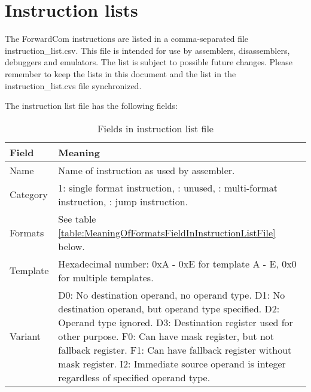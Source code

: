 \documentclass[forwardcom.tex]{subfiles}
\begin{document}
\RaggedRight

\chapter{Instruction lists}\label{chap:InstructionLists}
The ForwardCom instructions are listed in a comma-separated file instruction\_list.csv. This file is intended for use by assemblers, disassemblers, debuggers and emulators. The list is subject to possible future changes. Please remember to keep the lists in this document and the list in the instruction\_list.cvs file synchronized.
\vv

The instruction list file has the following fields:

\begin{longtable} {|p{18mm}|p{100mm}|}
\caption{Fields in instruction list file} 
\label{table:fieldsInInstructionListFile}
\\
\endfirsthead
\endhead
\hline
\bfseries Field & \bfseries Meaning  \\
\hline
Name & Name of instruction as used by assembler.  \\
\hline
Category & 1: single format instruction, \newline
           2: unused,  \newline
           3: multi-format instruction,  \newline
           4: jump instruction. \\
\hline
Formats & See table \ref{table:MeaningOfFormatsFieldInInstructionListFile} below.  \\
\hline
Template & Hexadecimal number:  \newline
           0xA - 0xE for template A - E,  \newline
           0x0 for multiple templates. \\
\hline
Variant & 
D0:  No destination operand, no operand type.\newline
D1:  No destination operand, but operand type specified.\newline
D2:  Operand type ignored.\newline
D3:  Destination register used for other purpose.\newline
F0:  Can have mask register, but not fallback register.\newline
F1:  Can have fallback register without mask register.\newline
I2:  Immediate source operand is integer regardless of specified operand type.\newline

\end{longtable}
\end{document}
